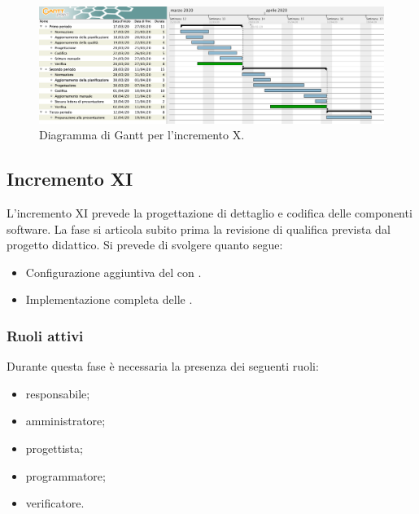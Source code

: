 		\begin{landscape}
          \begin{figure}[H]
            \centering
            \includegraphics[width=\linewidth]{images/ganttDettaglioCodifica} %
            \caption{Diagramma di Gantt per l'incremento X.}
          \end{figure}		
		\end{landscape}


		\subsection{Incremento XI}
			
			L'incremento XI prevede la progettazione di dettaglio e codifica delle componenti software. La fase si articola subito prima la revisione di qualifica prevista dal progetto didattico. Si prevede di svolgere quanto segue:
			\begin{itemize}
				\item Configurazione aggiuntiva del  con . 
				\item Implementazione completa delle .
			\end{itemize}
			
			\subsubsection{Ruoli attivi}
			
				Durante questa fase è necessaria la presenza dei seguenti ruoli:
				\begin{itemize}
					\item responsabile;
					\item amministratore;
					\item progettista;
					\item programmatore;
					\item verificatore.
				\end{itemize}
			
